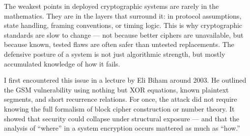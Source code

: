 \begin{commentary}

The weakest points in deployed cryptographic systems are rarely in the mathematics. They are in the layers that surround it: in protocol assumptions, state handling, framing conventions, or timing logic. This is why cryptographic standards are slow to change — not because better ciphers are unavailable, but because known, tested flaws are often safer than untested replacements. The defensive posture of a system is not just algorithmic strength, but mostly accumulated knowledge of how it fails.

I first encountered this issue in a lecture by Eli Biham around 2003. He outlined the GSM vulnerability using nothing but XOR equations, known plaintext segments, and short recurrence relations. For once, the attack did not require knowing the full formalism of block cipher construction or number theory. It showed that security could collapse under structural exposure — and that the analysis of “where” in a system encryption occurs mattered as much as “how.”
\end{commentary}

\thispagestyle{empty}
\begin{figure}[p]
\centering
{}
\end{figure}

